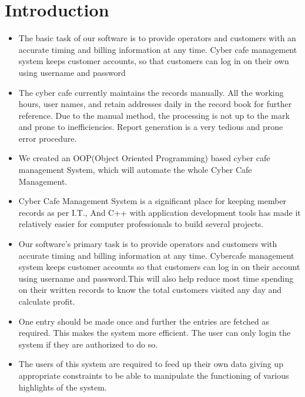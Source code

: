 \documentclass[12pt]{article}
\begin{document}
\section{Introduction}
\begin{itemize}
    \vspace{5mm}
    \large \item The basic task of our software is to provide operators and customers with an accurate timing and billing information at any time. Cyber cafe management system keeps customer accounts, so that customers can log in on their own using username and password
    \large \item The cyber cafe currently maintains the records manually. All the working hours, user names, and retain addresses daily in the record book for further reference. Due to the manual method, the processing is not up to the mark and prone to inefficiencies. Report generation is a very tedious and prone error procedure. 
    \large \item We created an OOP(Object Oriented Programming) based cyber cafe management System, which will automate the whole Cyber Cafe Management.
    \large \item Cyber Cafe Management System is a significant place for keeping member records as per I.T., And C++ with application development tools has made it relatively easier for computer professionals to build several projects.
    \large \item Our software's primary task is to provide operators and customers with accurate timing and billing information at any time. Cybercafe management system keeps customer accounts so that customers can log in on their account using username and password.This will also help reduce most time spending on their written records to know the total customers visited any day and calculate profit.
    \large \item One entry should be made once and further the entries are fetched as required. This makes the system more efficient. The user can only login the system if they are authorized to do so.
    \large \item  The users of this system are required to feed up their own data giving up appropriate constraints to be able to manipulate the functioning of various highlights of the system.
\end{itemize}
\newpage
\end{document}
